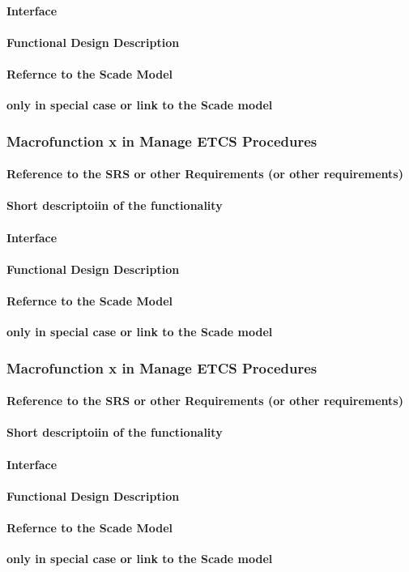 \paragraph{Interface}
\paragraph{Functional Design Description}
\paragraph{Refernce to the Scade Model}
\textbf{only in special case or link to the Scade model}

\subsubsection{Macrofunction x in Manage ETCS Procedures}%
\paragraph{Reference to the SRS or other Requirements (or other requirements)}
\paragraph{Short descriptoiin of the functionality}
\paragraph{Interface}
\paragraph{Functional Design Description}
\paragraph{Refernce to the Scade Model}
\textbf{only in special case or link to the Scade model}

\subsubsection{Macrofunction x in Manage ETCS Procedures}%
\paragraph{Reference to the SRS or other Requirements (or other requirements)}
\paragraph{Short descriptoiin of the functionality}
\paragraph{Interface}
\paragraph{Functional Design Description}
\paragraph{Refernce to the Scade Model}
\textbf{only in special case or link to the Scade model}

